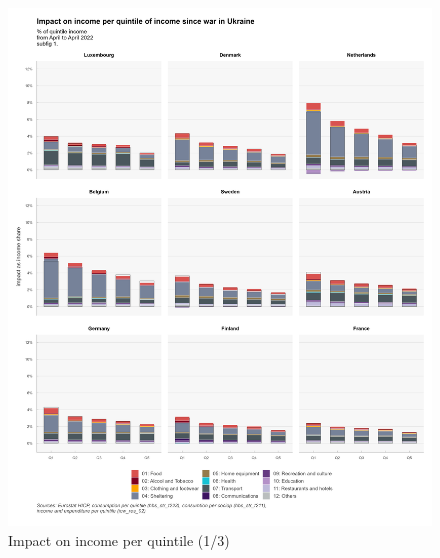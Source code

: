 \documentclass[
  9pt,
  a4paper,
  DIV=11,
  numbers=noendperiod]{scrartcl}
\begin{document}
\begin{figure}

\caption{Impact on income per quintile (1/3)}

{\centering \includegraphics[width=17cm,height=\textheight]{../svg/coicop_l1_1y_1.png}

}

\end{figure}
\end{document}
